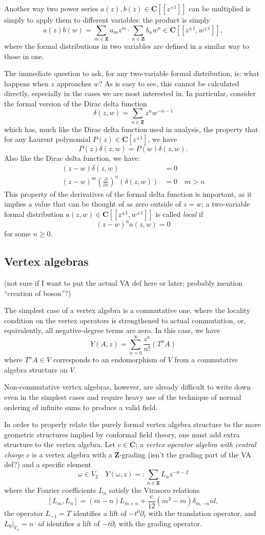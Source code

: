 \documentclass{article}
\newcommand{\CC}{\mathbold{C}}
\newcommand{\ZZ}{\mathbold{Z}}
\begin{document}
Another way two power series $a(z),b(z) \in \CC[[z^{\pm 1}]]$ can be multiplied is simply to apply them to different variables: the product is simply
\[a(z)b(w)=\sum_{m \in \ZZ}a_mz^m \cdot \sum_{n \in \ZZ}b_nw^n \in \CC[[z^{\pm 1},w^{\pm 1}]], \]
where the formal distributions in two variables are defined in a similar way to those in one.

The immediate question to ask, for any two-variable formal distribution, is: what happens when $z$ approaches $w$?  As is easy to see, this cannot be calculated directly, especially in the cases we are most interested in.  In particular, consider the formal version of the Dirac delta function
\[\delta(z,w)=\sum_{n \in \ZZ} z^n w^{-n-1} \]
which has, much like the Dirac delta function used in analysis, the property that for any Laurent polynomial $P(z) \in \CC[z^{\pm 1}]$, we have
\[P(z) \delta(z,w) = P(w) \delta(z,w). \]
Also like the Dirac delta function, we have:
\begin{align*}
  (z-w) \delta(z,w) &= 0\\
  (z-w)^m \left(\frac{\partial}{\partial z} \right)^n (\delta(z,w))&=0 \quad m>n
\end{align*}
This property of the derivatives of the formal delta function is important, as it implies a value that can be thought of as zero outside of $z=w$; a two-variable formal distribution $a(z,w) \in \CC[[z^{\pm 1},w^{\pm 1}]]$ is called \textit{local} if
\[(z-w)^n a(z,w)=0 \]
for some $n \ge 0$.

\subsection{Vertex algebras}

(not sure if I want to put the actual VA def here or later; probably mention ``creation of boson''?)

The simplest case of a vertex algebra is a commutative one, where the locality condition on the vertex operators is strengthened to actual commutation, or, equivalently, all negative-degree terms are zero.  In this case, we have
\[Y(A,z)=\sum_{n=0}^{\infty} \frac{z^n}{n!}(T^nA) \]
where $T^nA \in V$ corresponds to an endomorphism of $V$ from a commutative algebra structure on $V$.

Non-commutative vertex algebras, however, are already difficult to write down even in the simplest cases and require heavy use of the technique of normal ordering of infinite sums to produce a valid field.

In order to properly relate the purely formal vertex algebra structure to the more geometric structures implied by conformal field theory, one must add extra structure to the vertex algebra.  Let $c \in \CC$; a \textit{vertex operator algebra with central charge $c$} is a vertex algebra with a $\ZZ$-grading (isn't the grading part of the VA def?) and a specific element
\[\omega \in V_2 \quad Y(\omega,z) =: \sum_{n \in \ZZ} L_n z^{-n-2} \]
where the Fourier coefficients $L_n$ satisfy the Virasoro relations
\[[L_m,L_n]=(m-n)L_{m+n}+\frac{c}{12}(m^3-m)\delta_{m,-n} id, \]
the operator $L_{-1}=T$ identifies a lift of $-t^0\partial_t$ with the translation operator, and $L_0|_{V_n}=n \cdot id$ identifies a lift of $-t\partial_t$ with the grading operator.
\end{document}
